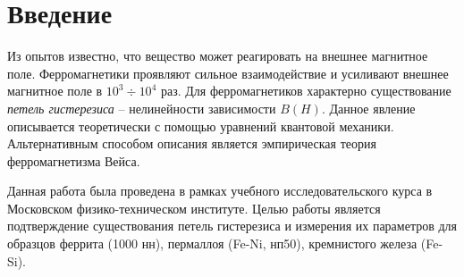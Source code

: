 \section*{Введение}

Из опытов известно, что вещество может реагировать на внешнее магнитное поле. Ферромагнетики проявляют сильное взаимодействие и усиливают внешнее магнитное поле в $10^3 \div 10^4$ раз. Для ферромагнетиков характерно существование \textit{петель гистерезиса} -- нелинейности зависимости $B(H)$. Данное явление описывается теоретически с помощью уравнений квантовой механики. Альтернативным способом описания является эмпирическая теория ферромагнетизма Вейса.

Данная работа была проведена в рамках учебного исследовательского курса в Московском физико-техническом институте. Целью работы является подтверждение существования петель гистерезиса и измерения их параметров для образцов феррита (1000 нн), пермаллоя (Fe-Ni, нп50), кремнистого железа (Fe-Si).

